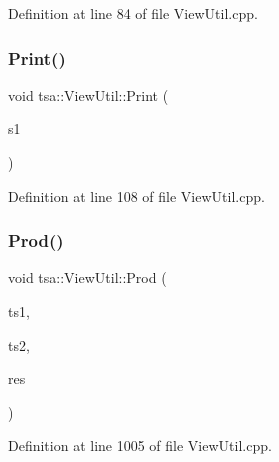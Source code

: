 Definition at line 84 of file View\+Util.\+cpp.

\mbox{\label{classtsa_1_1_view_util_aae610aa81fa557062de40594c246f54e}} 
\subsubsection{\texorpdfstring{Print()}{Print()}\hspace{0.1cm}{\footnotesize\ttfamily [3/3]}}
{\footnotesize\ttfamily void tsa\+::\+View\+Util\+::\+Print (\begin{DoxyParamCaption}\item[{\hyperlink{namespacetsa_ac599574bcc094eda25613724b8f3ca9e}{Seq\+View\+Double} \&}]{s1 }\end{DoxyParamCaption})\hspace{0.3cm}{\ttfamily [static]}}



Definition at line 108 of file View\+Util.\+cpp.

\mbox{\label{classtsa_1_1_view_util_afd5abb9a4e1b52991858e82299f1dd0a}} 
\subsubsection{\texorpdfstring{Prod()}{Prod()}\hspace{0.1cm}{\footnotesize\ttfamily [1/2]}}
{\footnotesize\ttfamily void tsa\+::\+View\+Util\+::\+Prod (\begin{DoxyParamCaption}\item[{\hyperlink{namespacetsa_ac599574bcc094eda25613724b8f3ca9e}{Seq\+View\+Double} \&}]{ts1,  }\item[{\hyperlink{namespacetsa_ac599574bcc094eda25613724b8f3ca9e}{Seq\+View\+Double} \&}]{ts2,  }\item[{\hyperlink{namespacetsa_ac599574bcc094eda25613724b8f3ca9e}{Seq\+View\+Double} \&}]{res }\end{DoxyParamCaption})\hspace{0.3cm}{\ttfamily [static]}}



Definition at line 1005 of file View\+Util.\+cpp.

